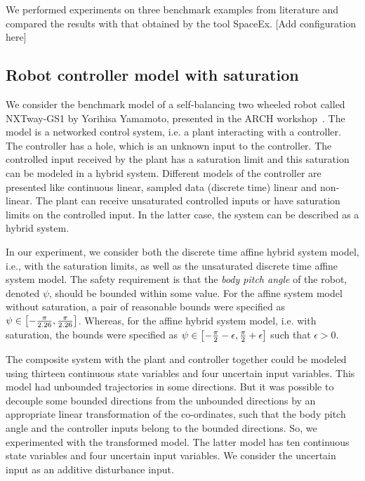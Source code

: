 We performed experiments on three benchmark examples from literature
and compared the results with that obtained by the tool SpaceEx. [Add
  configuration here]

\subsection{Robot controller model with saturation}   We consider the benchmark
model of a self-balancing two wheeled robot called NXTway-GS1 by
Yorihisa Yamamoto, presented in the ARCH workshop~\cite{TODO}.  The
model is a networked control system, i.e. a plant interacting with a
controller.  The controller has a hole, which is an unknown input to
the controller.  The controlled input received by the plant has a
saturation limit and this saturation can be modeled in a hybrid
system.  Different models of the controller are presented like
continuous linear, sampled data (discrete time) linear and non-linear.
The plant can receive unsaturated controlled inputs or have saturation
limits on the controlled input.  In the latter case, the system can be
described as a hybrid system.

In our experiment, we consider both the discrete time affine hybrid
system model, i.e., with the saturation limits, as well as the
unsaturated discrete time affine system model.  The safety requirement
is that the \emph{body pitch angle} of the robot, denoted $\psi$,
should be bounded within some value.  For the affine system model
without saturation, a pair of reasonable bounds were specified as
$\psi\in\left[-\frac{\pi}{2.26},\frac{\pi}{2.26}\right]$.  Whereas, for the
affine hybrid system model, i.e. with saturation, the bounds were
specified as
$\psi\in\left[-\frac{\pi}{2}-\epsilon,\frac{\pi}{2}+\epsilon\right]$ such
that $\epsilon>0$.

The composite system with the plant and controller together could be
modeled using thirteen continuous state variables and four uncertain input
variables.  This model had unbounded trajectories in some
directions.  But it was possible to decouple some bounded
directions from the unbounded directions by an appropriate linear
transformation of the co-ordinates, such that the body pitch angle and the
controller inputs belong to the bounded directions.  So, we
experimented with the transformed model.  The latter model has ten
continuous state variables and four uncertain input variables.  We consider
the uncertain input as an additive disturbance input.

